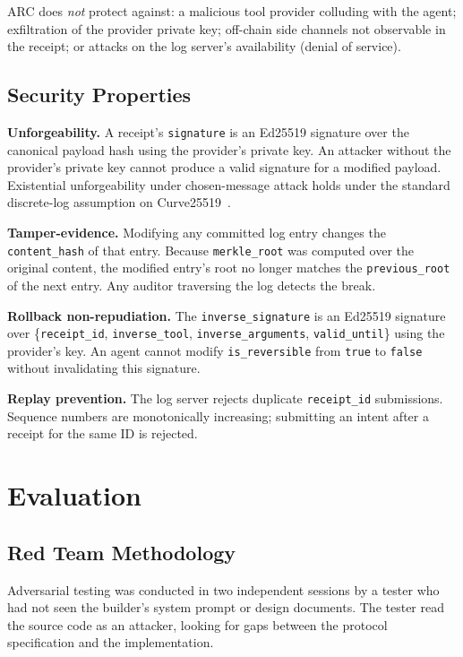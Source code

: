 \documentclass[10pt,twocolumn]{article}
\begin{document}
ARC does \emph{not} protect against: a malicious tool provider colluding with
the agent; exfiltration of the provider private key; off-chain side channels
not observable in the receipt; or attacks on the log server's availability
(denial of service).

\subsection{Security Properties}

\textbf{Unforgeability.} A receipt's \texttt{signature} is an Ed25519 signature
over the canonical payload hash using the provider's private key. An attacker
without the provider's private key cannot produce a valid signature for a
modified payload. Existential unforgeability under chosen-message attack
holds under the standard discrete-log assumption on Curve25519~\cite{ed25519}.

\textbf{Tamper-evidence.} Modifying any committed log entry changes the
\texttt{content\_hash} of that entry. Because \texttt{merkle\_root} was
computed over the original content, the modified entry's root no longer
matches the \texttt{previous\_root} of the next entry. Any auditor
traversing the log detects the break.

\textbf{Rollback non-repudiation.} The \texttt{inverse\_signature} is an
Ed25519 signature over \{\texttt{receipt\_id}, \texttt{inverse\_tool},
\texttt{inverse\_arguments}, \texttt{valid\_until}\} using the provider's key.
An agent cannot modify \texttt{is\_reversible} from \texttt{true} to
\texttt{false} without invalidating this signature.

\textbf{Replay prevention.} The log server rejects duplicate
\texttt{receipt\_id} submissions. Sequence numbers are monotonically
increasing; submitting an intent after a receipt for the same ID is rejected.

\section{Evaluation}

\subsection{Red Team Methodology}

Adversarial testing was conducted in two independent sessions by a tester
who had not seen the builder's system prompt or design documents. The tester
read the source code as an attacker, looking for gaps between the protocol
specification and the implementation.
\end{document}
